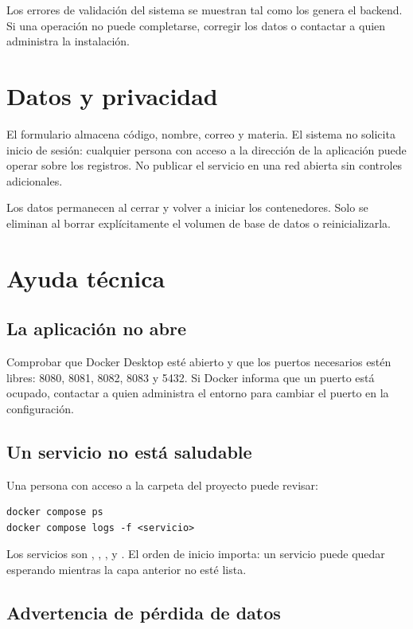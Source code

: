 Los errores de validación del sistema se muestran tal como los genera el backend. Si una operación no puede completarse, corregir los datos o contactar a quien administra la instalación.

\section{Datos y privacidad}

El formulario almacena código, nombre, correo y materia. El sistema no solicita inicio de sesión: cualquier persona con acceso a la dirección de la aplicación puede operar sobre los registros. No publicar el servicio en una red abierta sin controles adicionales.

Los datos permanecen al cerrar y volver a iniciar los contenedores. Solo se eliminan al borrar explícitamente el volumen de base de datos o reinicializarla.

\section{Ayuda técnica}

\subsection{La aplicación no abre}

Comprobar que Docker Desktop esté abierto y que los puertos necesarios estén libres: 8080, 8081, 8082, 8083 y 5432. Si Docker informa que un puerto está ocupado, contactar a quien administra el entorno para cambiar el puerto en la configuración.

\subsection{Un servicio no está saludable}

Una persona con acceso a la carpeta del proyecto puede revisar:

\begin{lstlisting}
docker compose ps
docker compose logs -f <servicio>
\end{lstlisting}

Los servicios son , , ,  y . El orden de inicio importa: un servicio puede quedar esperando mientras la capa anterior no esté lista.

\subsection{Advertencia de pérdida de datos}

